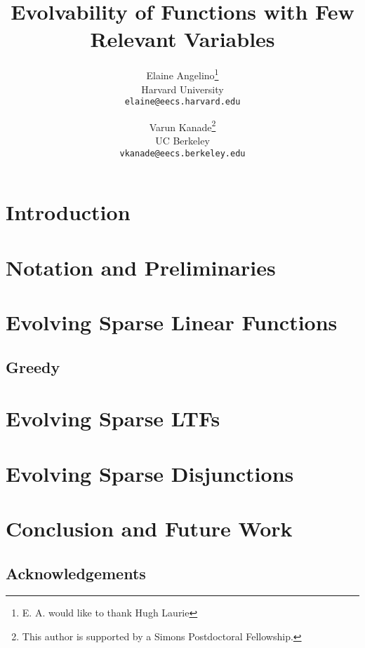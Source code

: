 \documentclass[11pt]{article}
\begin{document}
\title{Evolvability of Functions with Few Relevant Variables}
\author{Elaine Angelino\thanks{E. A. would like to thank Hugh Laurie} \\
Harvard University \\ \texttt{elaine@eecs.harvard.edu} \and Varun
Kanade\thanks{This author is supported by a Simons Postdoctoral Fellowship.} \\
UC Berkeley \\ \texttt{vkanade@eecs.berkeley.edu}}

\maketitle

\begin{abstract}

\end{abstract}

\section{Introduction}


\section{Notation and Preliminaries}


\section{Evolving Sparse Linear Functions}


\subsection{Greedy}


\section{Evolving Sparse LTFs}


\section{Evolving Sparse Disjunctions}


\section{Conclusion and Future Work}


\subsection*{Acknowledgements} 


\nocite{*}

\end{document}
